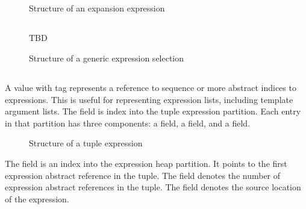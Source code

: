 
\subsection{}
\label{sec:ifc:ExprSort:Expansion}

\begin{figure}[H]
	\centering
	\caption{Structure of an expansion expression}
	\label{fig:ifc-expansion-expr-structure}
\end{figure}



\subsection{}
\label{sec:ifc:ExprSort:Generic}

\begin{figure}[H]
	\centering
	TBD
	\caption{Structure of a generic expression selection}
	\label{fig:ifc-generic-expr-structure}
\end{figure}



\subsection{}
\label{sec:ifc:ExprSort:Tuple}

A  value with tag  represents a reference
to sequence or more abstract indices to expressions.  This is useful for representing expression lists,
including template argument lists.
The  field is index into the tuple expression partition.
Each entry in that partition has three components: a  field, a  field, and a  field.
%
\begin{figure}[H]
	\centering
	\caption{Structure of a tuple expression}
	\label{fig:ifc-tuple-expression-structure}
\end{figure}
%
The  field is an index into the expression heap partition. It points to the first expression abstract reference in the tuple.
The  field denotes the number of expression abstract references in the tuple.
The  field denotes the source location of the expression.

